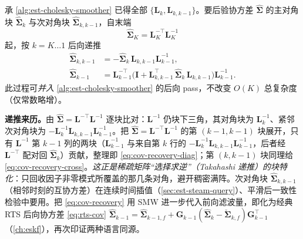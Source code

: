 \begin{algo}\label{alg:est-cov-recovery}
承 \cref{alg:est-cholesky-smoother} 已得全部 $\{\mathbf{L}_k,\mathbf{L}_{k,k-1}\}$。要后验协方差 $\hat{\boldsymbol{\Sigma}}$ 的主对角块 $\hat{\boldsymbol{\Sigma}}_k$ 与次对角块 $\hat{\boldsymbol{\Sigma}}_{k,k-1}$，自末端
\begin{equation}
  \hat{\boldsymbol{\Sigma}}_K=\mathbf{L}_K^{-\top}\mathbf{L}_K^{-1}
  \label{eq:cov-recovery-init}
\end{equation}
起，按 $k=K\dots 1$ 后向递推
\begin{subequations}\label{eq:cov-recovery}
\begin{align}
  \hat{\boldsymbol{\Sigma}}_{k,k-1}&=-\hat{\boldsymbol{\Sigma}}_k\,\mathbf{L}_{k,k-1}\mathbf{L}_{k-1}^{-1},\label{eq:cov-recovery-cross}\\
  \hat{\boldsymbol{\Sigma}}_{k-1}&=\mathbf{L}_{k-1}^{-\top}\big(\mathbf{I}+\mathbf{L}_{k,k-1}^\top\,\hat{\boldsymbol{\Sigma}}_k\,\mathbf{L}_{k,k-1}\big)\mathbf{L}_{k-1}^{-1}.\label{eq:cov-recovery-diag}
\end{align}
\end{subequations}
此过程可\emph{并入} \cref{alg:est-cholesky-smoother} 的后向 pass，不改变 $O(K)$ 总复杂度（仅常数略增）。
\end{algo}

\noindent\textbf{递推来历。}\;由 $\hat{\boldsymbol{\Sigma}}=\mathbf{L}^{-\top}\mathbf{L}^{-1}$ 逐块比对：$\mathbf{L}^{-1}$ 仍块下三角，其对角块为 $\mathbf{L}_k^{-1}$、紧邻次对角块为 $-\mathbf{L}_k^{-1}\mathbf{L}_{k,k-1}\mathbf{L}_{k-1}^{-1}$。把 $\hat{\boldsymbol{\Sigma}}=\mathbf{L}^{-\top}\mathbf{L}^{-1}$ 的第 $(k\!-\!1,k\!-\!1)$ 块展开，只有 $\mathbf{L}^{-1}$ 第 $k\!-\!1$ 列的两块（$\mathbf{L}_{k-1}^{-1}$ 与来自第 $k$ 行的 $-\mathbf{L}_k^{-1}\mathbf{L}_{k,k-1}\mathbf{L}_{k-1}^{-1}$，后者经 $\mathbf{L}^{-\top}$ 配对回 $\hat{\boldsymbol{\Sigma}}_k$）贡献，整理即 \cref{eq:cov-recovery-diag}；第 $(k,k\!-\!1)$ 块同理给 \cref{eq:cov-recovery-cross}。\emph{这正是稀疏矩阵“选择求逆”（Takahashi 递推）的块特化}：只回收因子非零模式所覆盖的那几条对角，避开稠密满阵。次对角块 $\hat{\boldsymbol{\Sigma}}_{k,k-1}$（相邻时刻的互协方差）在连续时间插值（\cref{sec:est-steam-query}）、平滑后一致性检验中要用。把 \cref{eq:cov-recovery} 用 SMW 进一步代入前向滤波量，即化为经典 RTS 后向协方差 \cref{eq:rts-cov} $\hat{\boldsymbol{\Sigma}}_{k-1}=\hat{\boldsymbol{\Sigma}}_{k-1,f}+\mathbf{G}_{k-1}(\hat{\boldsymbol{\Sigma}}_k-\check{\boldsymbol{\Sigma}}_{k,f})\mathbf{G}_{k-1}^\top$（\cref{ch:eskf}），再次印证两种语言同源。

